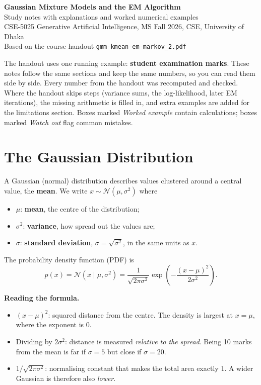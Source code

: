 \documentclass[11pt,a4paper]{article}
\newcommand{\N}{\mathcal{N}}
\begin{document}
\begin{center}
{\LARGE\bfseries Gaussian Mixture Models and the EM Algorithm}\\[6pt]
Study notes with explanations and worked numerical examples\\
CSE-5025 Generative Artificial Intelligence, MS Fall 2026, CSE, University of Dhaka\\
Based on the course handout \texttt{gmm-kmean-em-markov\_2.pdf}
\end{center}

\begin{keyidea}
The handout uses one running example: \textbf{student examination marks}. These notes follow the same sections and keep the same numbers, so you can read them side by side. Every number from the handout was recomputed and checked. Where the handout skips steps (variance sums, the log-likelihood, later EM iterations), the missing arithmetic is filled in, and extra examples are added for the limitations section. Boxes marked \emph{Worked example} contain calculations; boxes marked \emph{Watch out} flag common mistakes.
\end{keyidea}

\tableofcontents
\newpage

\section{The Gaussian Distribution}

A Gaussian (normal) distribution describes values clustered around a central value, the \textbf{mean}. We write $x\sim\N(\mu,\sigma^2)$ where
\begin{itemize}[nosep]
\item $\mu$: \textbf{mean}, the centre of the distribution;
\item $\sigma^2$: \textbf{variance}, how spread out the values are;
\item $\sigma$: \textbf{standard deviation}, $\sigma=\sqrt{\sigma^2}$, in the same units as $x$.
\end{itemize}
The probability density function (PDF) is
\[
\boxed{\;p(x)=\N(x\mid\mu,\sigma^2)=\frac{1}{\sqrt{2\pi\sigma^2}}\exp\!\left(-\frac{(x-\mu)^2}{2\sigma^2}\right).\;}
\]

\textbf{Reading the formula.}
\begin{itemize}[nosep]
\item $(x-\mu)^2$: squared distance from the centre. The density is largest at $x=\mu$, where the exponent is $0$.
\item Dividing by $2\sigma^2$: distance is measured \emph{relative to the spread}. Being 10 marks from the mean is far if $\sigma=5$ but close if $\sigma=20$.
\item $1/\sqrt{2\pi\sigma^2}$: normalising constant that makes the total area exactly $1$. A wider Gaussian is therefore also \emph{lower}.
\end{itemize}
\end{document}
